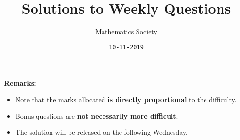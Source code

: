 \documentclass[addpoints]{exam}
\title{Solutions to Weekly Questions}
\author{Mathematics Society}
\date{\texttt{10-11-2019}}
\begin{document}


\maketitle


\textbf{Remarks:}
\begin{itemize}
    \item Note that the marks allocated \textbf{is directly proportional} to the difficulty.
    \item Bonus questions are \textbf{not necessarily more difficult}.
    \item The solution will be released on the following Wednesday.
\end{itemize}



\end{document}
